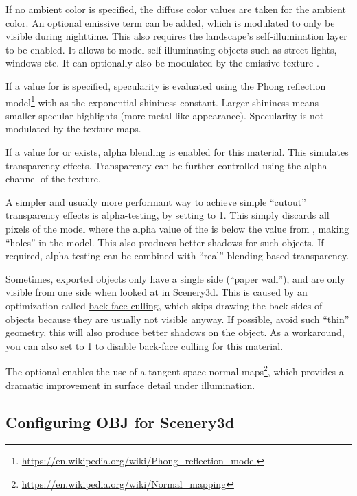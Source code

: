 If no ambient color is specified, the diffuse color values are taken for the
ambient color. An optional emissive term  can be added, which is
modulated to only be visible during nighttime. This also requires the
landscape's self-illumination layer to be enabled. It allows to model
self-illuminating objects such as street lights, windows etc. It can optionally
also be modulated by the emissive texture .

If a value for  is specified, specularity is evaluated
using the Phong reflection
model\footnote{\url{https://en.wikipedia.org/wiki/Phong_reflection_model}}
with  as the exponential shininess constant. Larger
shininess means smaller specular highlights (more metal-like
appearance). Specularity is not modulated by the texture maps.

If a value for  or  exists, alpha blending is enabled for this
material. This simulates transparency effects. Transparency can be further
controlled using the alpha channel of the  texture.

A simpler and usually more performant way to achieve simple ``cutout''
transparency effects is alpha-testing, by setting  to 1. This
simply discards all pixels of the model where the alpha value of the
 is below the  value from
, making ``holes'' in the model. This also produces
better shadows for such objects. If required, alpha testing can be combined with
``real'' blending-based transparency.

Sometimes, exported objects only have a single side (``paper wall''), and are only visible
from one side when looked at in Scenery3d. This is caused by an optimization
called \href{https://en.wikipedia.org/wiki/Back-face_culling}{back-face
culling}, which skips drawing the back sides of objects because they are usually
not visible anyway. If possible, avoid such ``thin'' geometry, this will also
produce better shadows on the object. As a workaround, you can also set
 to 1 to disable back-face culling for this material.

The optional  enables the use of a tangent-space
normal
maps\footnote{\url{https://en.wikipedia.org/wiki/Normal_mapping}},
which provides a dramatic improvement in surface detail under
illumination.

\subsection{Configuring OBJ for Scenery3d}
\label{sec:scenery3d:Configuring}

